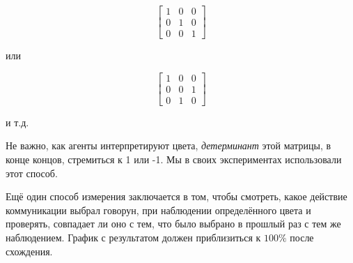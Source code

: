 \begin{equation*}
    \begin{bmatrix}
        1 & 0 & 0 \\
        0 & 1 & 0 \\
        0 & 0 & 1
    \end{bmatrix}
\end{equation*}

или

\begin{equation*}
    \begin{bmatrix}
        1 & 0 & 0 \\
        0 & 0 & 1 \\
        0 & 1 & 0
    \end{bmatrix}
\end{equation*}

и т.д.

Не важно, как агенты интерпретируют цвета, \textit{детерминант} этой матрицы, в конце концов, стремиться к 1 или -1. Мы в своих экспериментах использовали этот способ.

Ещё один способ измерения заключается в том, чтобы смотреть, какое действие коммуникации выбрал говорун, при наблюдении определённого цвета и проверять, совпадает ли оно с тем, что было выбрано в прошлый раз с тем же наблюдением. График с результатом должен приблизиться к $100\%$ после схождения.


